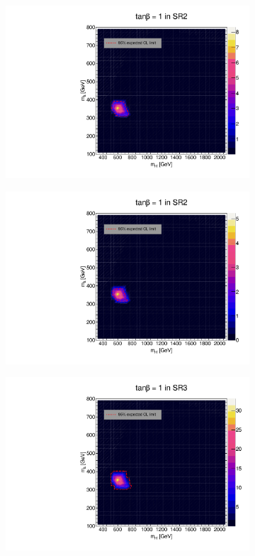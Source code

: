 \documentclass[12pt, a4paper]{book}
\begin{document}
\begin{figure}[!ht]
\begin{subfigure}[b]{0.49\textwidth}
      \includegraphics[width=1\textwidth]{Limits/Model_independent/100-150/2HDM/2HDM_ee_tb1.pdf}
   \end{subfigure}
   \hfill
   \begin{subfigure}[b]{0.49\textwidth}
      \centering
      \includegraphics[width=1\textwidth]{Limits/Model_independent/100-150/2HDM/2HDM_uu_tb1.pdf}
   \end{subfigure}
   \hfill
	\begin{subfigure}[b]{0.49\textwidth}
      \centering
      \includegraphics[width=1\textwidth]{Limits/Model_independent/150/2HDM/2HDM_ee_tb1.pdf}

\end{subfigure}
\end{figure}
\end{document}
